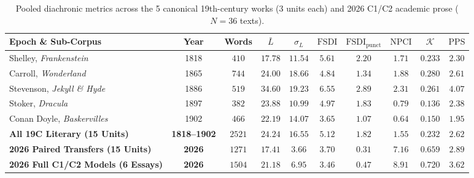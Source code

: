 \documentclass[11pt,reqno]{article}
\begin{document}
\begin{table}[ht]
\centering
\caption{Pooled diachronic metrics across the 5 canonical 19th-century works (3 units each) and 2026 C1/C2 academic prose ($N=36$ texts).}\label{tab:epochs}
\smallskip
\begin{tabular}{@{}lccccccccc@{}}
\toprule
Epoch \& Sub-Corpus & Year & Words & $\bar{L}$ & $\sigma_L$ & $\mathrm{FSDI}$ & $\mathrm{FSDI}_{\mathrm{punct}}$ & $\mathrm{NPCI}$ & $\mathcal{K}$ & $\mathrm{PPS}$ \\
\midrule
Shelley, \emph{Frankenstein} & 1818 & $410$ & $17.78$ & $11.54$ & $5.61$ & $2.20$ & $1.71$ & $0.233$ & $2.30$ \\
Carroll, \emph{Wonderland} & 1865 & $744$ & $24.00$ & $18.66$ & $4.84$ & $1.34$ & $1.88$ & $0.280$ & $2.61$ \\
Stevenson, \emph{Jekyll \& Hyde} & 1886 & $519$ & $34.60$ & $19.23$ & $6.55$ & $2.89$ & $2.31$ & $0.261$ & $4.07$ \\
Stoker, \emph{Dracula} & 1897 & $382$ & $23.88$ & $10.99$ & $4.97$ & $1.83$ & $0.79$ & $0.136$ & $2.38$ \\
Conan Doyle, \emph{Baskervilles} & 1902 & $466$ & $22.19$ & $14.07$ & $3.65$ & $1.07$ & $0.64$ & $0.150$ & $1.95$ \\
\midrule
\textbf{All 19C Literary (15 Units)} & \textbf{1818--1902} & $2521$ & $24.24$ & $16.55$ & $5.12$ & $1.82$ & $1.55$ & $0.232$ & $2.62$ \\
\textbf{2026 Paired Transfers (15 Units)} & \textbf{2026} & $1271$ & $\mathbf{17.41}$ & $\mathbf{3.66}$ & $\mathbf{3.70}$ & $\mathbf{0.31}$ & $\mathbf{7.16}$ & $\mathbf{0.659}$ & $\mathbf{2.89}$ \\
\textbf{2026 Full C1/C2 Models (6 Essays)} & \textbf{2026} & $1504$ & $\mathbf{21.18}$ & $\mathbf{6.95}$ & $\mathbf{3.46}$ & $\mathbf{0.47}$ & $\mathbf{8.91}$ & $\mathbf{0.720}$ & $\mathbf{3.62}$ \\
\bottomrule
\end{tabular}
\end{table}
\end{document}
